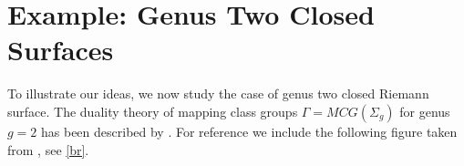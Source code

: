 \documentclass[12pt]{amsart}
\theoremstyle{definition}
\theoremstyle{remark}
\newcommand{\sC}{\mathscr{C}}
\newcommand{\sT}{\mathscr{T}}
\begin{document}



\section{Example: Genus Two Closed Surfaces}
To illustrate our ideas, we now study the case of genus two closed Riemann surface. The duality theory of mapping class groups $\Gamma=MCG(\Sigma_g)$ for genus $g=2$ has been described by \cite{Broaddus2012}. For reference we include the following figure taken from \cite[Fig.10]{Broaddus2012}, see \eqref{br}.%
\end{document}
